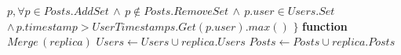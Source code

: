 \documentclass{article}
\begin{document}
\begin{algorithm}
\begin{algorithmic}
\State \hspace{\algorithmicindent}\hspace{\algorithmicindent} $p, \forall p \in Posts.AddSet \,\land\, p \not\in Posts.RemoveSet \,\land\, p.user \in Users.Set$
\State \hspace{\algorithmicindent}\hspace{\algorithmicindent} $ \land\, p.timestamp > UserTimestamps.Get(p.user).max()$
\State \hspace{\algorithmicindent}$\}$
\State {}
\State {}
\State
\State \textbf{function} $Merge\,(replica)$
\State \hspace{\algorithmicindent} $Users \leftarrow Users \cup replica.Users$ 
\State \hspace{\algorithmicindent} $Posts \leftarrow Posts \cup replica.Posts$
\end{algorithmic}
\end{algorithm}
\end{document}
